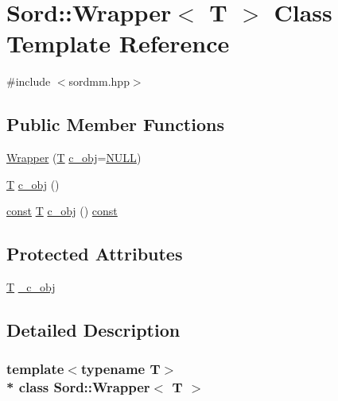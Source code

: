 \hypertarget{class_sord_1_1_wrapper}{}\section{Sord\+:\+:Wrapper$<$ T $>$ Class Template Reference}
\label{class_sord_1_1_wrapper}


{\ttfamily \#include $<$sordmm.\+hpp$>$}

\subsection*{Public Member Functions}
\begin{DoxyCompactItemize}
\item 
\hyperlink{class_sord_1_1_wrapper_ab539fff1455a9b4b43b21e01d795a1e9}{Wrapper} (\hyperlink{xmltchar_8h_a16a0f7e7053a679c9bf4289b441a2be7}{T} \hyperlink{class_sord_1_1_wrapper_a71bdf7e679555f72e07c749ab87366c8}{c\+\_\+obj}=\hyperlink{px__mixer_8h_a070d2ce7b6bb7e5c05602aa8c308d0c4}{N\+U\+LL})
\item 
\hyperlink{xmltchar_8h_a16a0f7e7053a679c9bf4289b441a2be7}{T} \hyperlink{class_sord_1_1_wrapper_a71bdf7e679555f72e07c749ab87366c8}{c\+\_\+obj} ()
\item 
\hyperlink{getopt1_8c_a2c212835823e3c54a8ab6d95c652660e}{const} \hyperlink{xmltchar_8h_a16a0f7e7053a679c9bf4289b441a2be7}{T} \hyperlink{class_sord_1_1_wrapper_a9f9639ab9373df9b34a283b8cb2c1932}{c\+\_\+obj} () \hyperlink{getopt1_8c_a2c212835823e3c54a8ab6d95c652660e}{const} 
\end{DoxyCompactItemize}
\subsection*{Protected Attributes}
\begin{DoxyCompactItemize}
\item 
\hyperlink{xmltchar_8h_a16a0f7e7053a679c9bf4289b441a2be7}{T} \hyperlink{class_sord_1_1_wrapper_aee0f3ad4f5a45a66c139dacbe6284547}{\+\_\+c\+\_\+obj}
\end{DoxyCompactItemize}


\subsection{Detailed Description}
\subsubsection*{template$<$typename T$>$\\*
class Sord\+::\+Wrapper$<$ T $>$}

